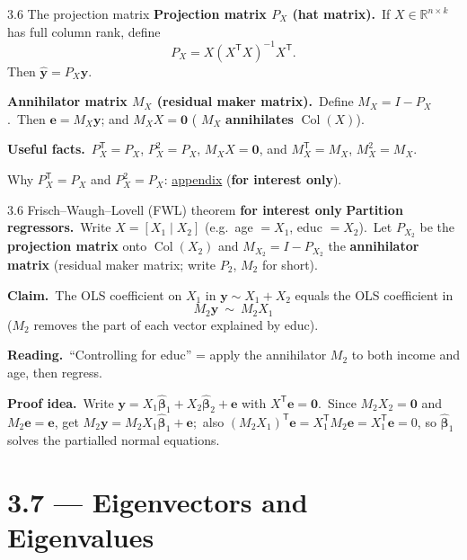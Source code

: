 \documentclass[11pt,aspectratio=169]{beamer}
\newcommand{\InterestOnly}{\textcolor{mAccent}{\textbf{for interest only}}}
\newcommand{\AppendixLink}[1]{%
  \hyperlink{#1}{\textcolor{mAccent}{appendix}}}
\begin{document}
\begin{frame}{3.6 The projection matrix}
  \footnotesize
  \textbf{Projection matrix $P_X$ (hat matrix).}\
  If $X\in\mathbb{R}^{n\times k}$ has full column rank, define
  \[
    P_X=X(X^{\mathsf T}X)^{-1}X^{\mathsf T}.
  \]
  Then $\widehat{\mathbf{y}}=P_X\mathbf{y}$.

  \medskip
  \textbf{Annihilator matrix $M_X$ (residual maker matrix).}\
  Define $M_X=I-P_X$.\
  Then $\mathbf{e}=M_X\mathbf{y}$; and $M_X X=\mathbf{0}$ ( $M_X$ \textbf{annihilates} $\operatorname{Col}(X)$).

  \medskip
  \textbf{Useful facts.}\
  $P_X^{\mathsf T}=P_X$, $P_X^2=P_X$, $M_X X=\mathbf{0}$, and $M_X^{\mathsf T}=M_X$, $M_X^2=M_X$.

  \medskip
  {\scriptsize Why $P_X^{\mathsf T}=P_X$ and $P_X^2=P_X$: \AppendixLink{sec:projection-matrix-properties} (\InterestOnly).}
\end{frame}

\begin{frame}{3.6 Frisch--Waugh--Lovell (FWL) theorem \InterestOnly}
  \footnotesize
  \textbf{Partition regressors.}\
  Write $X=[X_1\mid X_2]$ (e.g.\ age $=X_1$, educ $=X_2$).\
  Let $P_{X_2}$ be the \textbf{projection matrix} onto $\operatorname{Col}(X_2)$ and
  $M_{X_2}=I-P_{X_2}$ the \textbf{annihilator matrix} (residual maker matrix; write $P_2$, $M_2$ for short).

  \medskip
  \textbf{Claim.}\
  The OLS coefficient on $X_1$ in $\mathbf{y}\sim X_1+X_2$ equals the OLS coefficient in
  \[
    M_2\mathbf{y}\ \sim\ M_2X_1
  \]
  ($M_2$ removes the part of each vector explained by educ).

  \medskip
  \textbf{Reading.}\
  ``Controlling for educ'' = apply the annihilator $M_2$ to both income and age, then regress.

  \medskip
  {\scriptsize \textbf{Proof idea.}\
  Write $\mathbf{y}=X_1\widehat{\boldsymbol{\beta}}_1+X_2\widehat{\boldsymbol{\beta}}_2+\mathbf{e}$ with $X^{\mathsf T}\mathbf{e}=\mathbf{0}$.\
  Since $M_2X_2=\mathbf{0}$ and $M_2\mathbf{e}=\mathbf{e}$, get $M_2\mathbf{y}=M_2X_1\widehat{\boldsymbol{\beta}}_1+\mathbf{e}$;\
  also $(M_2X_1)^{\mathsf T}\mathbf{e}=X_1^{\mathsf T}M_2\mathbf{e}=X_1^{\mathsf T}\mathbf{e}=0$, so $\widehat{\boldsymbol{\beta}}_1$ solves the partialled normal equations.}
\end{frame}

\section{3.7 --- Eigenvectors and Eigenvalues}
\end{document}
